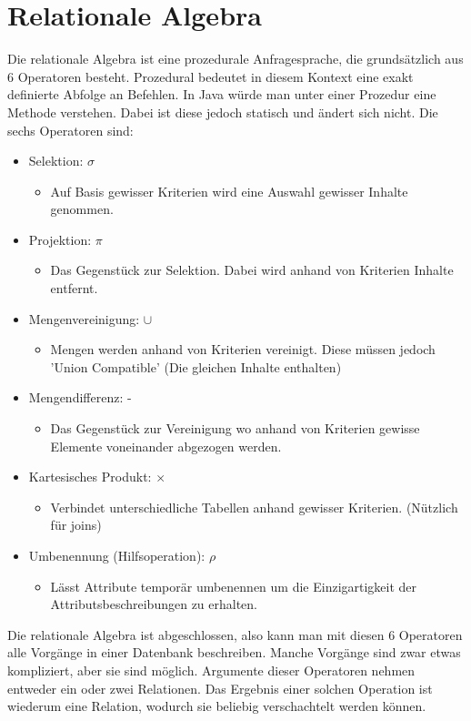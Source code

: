 \documentclass{article}
\begin{document}
 	\section{Relationale Algebra}
 	Die relationale Algebra ist eine prozedurale Anfragesprache, die grundsätzlich aus 6 Operatoren besteht. Prozedural bedeutet in diesem Kontext eine exakt definierte Abfolge an Befehlen. In Java würde man unter einer Prozedur eine Methode verstehen. Dabei ist diese jedoch statisch und ändert sich nicht. Die sechs Operatoren sind:
 	\begin{itemize}
 		\item{Selektion: $\sigma$}
 		\begin{itemize}
 			\item{Auf Basis gewisser Kriterien wird eine Auswahl gewisser Inhalte genommen.}
 		\end{itemize}
 		\item{Projektion: $\pi$}
 		\begin{itemize}
 			\item{Das Gegenstück zur Selektion. Dabei wird anhand von Kriterien Inhalte entfernt.}
 		\end{itemize}
 		\item{Mengenvereinigung: $\cup$}
 		\begin{itemize}
 			\item{Mengen werden anhand von Kriterien vereinigt. Diese müssen jedoch 'Union Compatible' (Die gleichen Inhalte enthalten)}
 		\end{itemize}
 		\item{Mengendifferenz: -}
 		\begin{itemize}
 			\item{Das Gegenstück zur Vereinigung wo anhand von Kriterien gewisse Elemente voneinander abgezogen werden.}
 		\end{itemize}
 		\item{Kartesisches Produkt: $\times$}
 		\begin{itemize}
 			\item{Verbindet unterschiedliche Tabellen anhand gewisser Kriterien. (Nützlich für joins)}
 		\end{itemize}
 		\item{Umbenennung (Hilfsoperation): $\rho$}
 		\begin{itemize}
 			\item{Lässt Attribute temporär umbenennen um die Einzigartigkeit der Attributsbeschreibungen zu erhalten.}
 		\end{itemize}
 	\end{itemize}
 	Die relationale Algebra ist abgeschlossen, also kann man mit diesen 6 Operatoren alle Vorgänge in einer Datenbank beschreiben. Manche Vorgänge sind zwar etwas kompliziert, aber sie sind möglich. Argumente dieser Operatoren nehmen entweder ein oder zwei Relationen. Das Ergebnis einer solchen Operation ist wiederum eine Relation, wodurch sie beliebig verschachtelt werden können. \\
\end{document}

